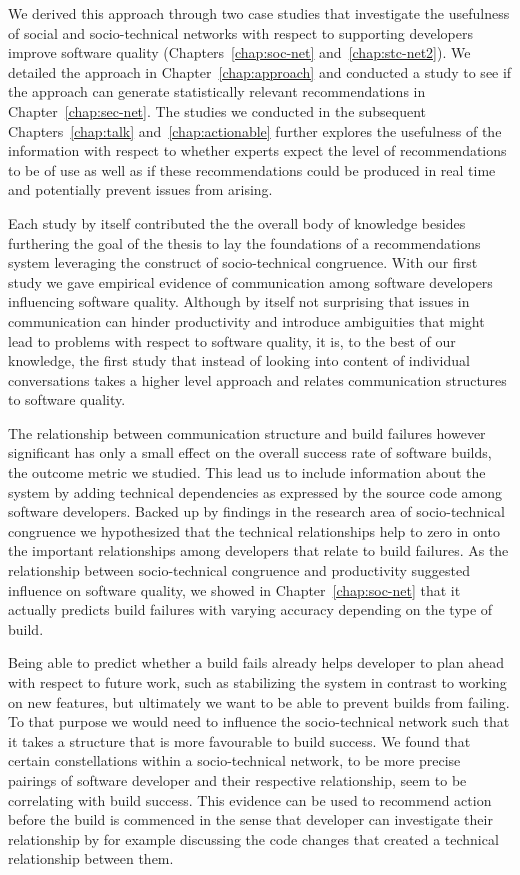 We derived this approach through two case studies that investigate the usefulness of social and socio-technical networks with respect to supporting developers improve software quality (Chapters~\ref{chap:soc-net} and~\ref{chap:stc-net2}).
We detailed the approach in Chapter~\ref{chap:approach} and conducted a study to see if the approach can generate statistically relevant recommendations in Chapter~\ref{chap:sec-net}.
The studies we conducted in the subsequent Chapters~\ref{chap:talk} and~\ref{chap:actionable} further explores the usefulness of the information with respect to whether experts expect the level of recommendations to be of use as well as if these recommendations could be produced in real time and potentially prevent issues from arising.

Each study by itself contributed the the overall body of knowledge besides furthering the goal of the thesis to lay the foundations of a recommendations system leveraging the construct of socio-technical congruence.
With our first study we gave empirical evidence of communication among software developers influencing software quality.
Although by itself not surprising that issues in communication can hinder productivity and introduce ambiguities that might lead to problems with respect to software quality, it is, to the best of our knowledge, the first study that instead of looking into content of individual  conversations takes a higher level approach and relates communication structures to software quality.

The relationship between communication structure and build failures however significant has only a small effect on the overall success rate of software builds, the outcome metric we studied.
This lead us to include information about the system by adding technical dependencies as expressed by the source code among software developers.
Backed up by findings in the research area of socio-technical congruence we hypothesized that the technical relationships help to zero in onto the important relationships among developers that relate to build failures.
As the relationship between socio-technical congruence and productivity suggested influence on software quality, we showed in Chapter~\ref{chap:soc-net} that it actually predicts build failures with varying accuracy depending on the type of build.

Being able to predict whether a build fails already helps developer to plan ahead with respect to future work, such as stabilizing the system in contrast to working on new features, but ultimately we want to be able to prevent builds from failing.
To that purpose we would need to influence the socio-technical network such that it takes a structure that is more favourable to build success.
We found that certain constellations within a socio-technical network, to be more precise pairings of software developer and their respective relationship, seem to be correlating with build success.
This evidence can be used to recommend action before the build is commenced in the sense that developer can investigate their relationship by for example discussing the code changes that created a technical relationship between them.

